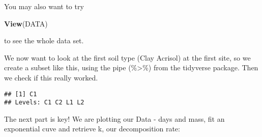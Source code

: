 \documentclass[
]{article}
\newenvironment{Shaded}{\begin{snugshade}}{\end{snugshade}}
\newcommand{\DataTypeTok}[1]{\textcolor[rgb]{0.13,0.29,0.53}{#1}}
\newcommand{\DecValTok}[1]{\textcolor[rgb]{0.00,0.00,0.81}{#1}}
\newcommand{\FloatTok}[1]{\textcolor[rgb]{0.00,0.00,0.81}{#1}}
\newcommand{\KeywordTok}[1]{\textcolor[rgb]{0.13,0.29,0.53}{\textbf{#1}}}
\newcommand{\NormalTok}[1]{#1}
\newcommand{\OperatorTok}[1]{\textcolor[rgb]{0.81,0.36,0.00}{\textbf{#1}}}
\newcommand{\StringTok}[1]{\textcolor[rgb]{0.31,0.60,0.02}{#1}}
\begin{document}
You may also want to try

\begin{Shaded}
\begin{Highlighting}[]
\KeywordTok{View}\NormalTok{(DATA)}
\end{Highlighting}
\end{Shaded}

to see the whole data set.

We now want to look at the first soil type (Clay Acrisol) at the first
site, so we create a subset like this, using the pipe (\%\textgreater\%)
from the tidyverse package. Then we check if this really worked.

\begin{Shaded}
\end{Shaded}

\begin{verbatim}
## [1] C1
## Levels: C1 C2 L1 L2
\end{verbatim}

The next part is key! We are plotting our Data - days and mass, fit an
exponential cuve and retrieve k, our decomposition rate:

\begin{Shaded}
\end{Shaded}
\end{document}
